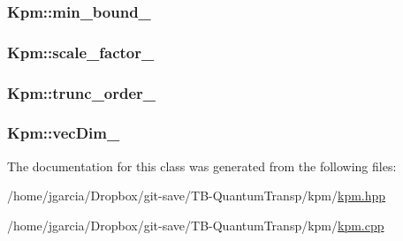 \hypertarget{classKpm_aec9beedeb9a63d641f95ac3751f6d2e4}{
\subsubsection[{min\+\_\+bound\+\_\+}]{ Kpm\+::min\+\_\+bound\+\_\+\hspace{0.3cm}{\ttfamily [private]}}}\label{classKpm_aec9beedeb9a63d641f95ac3751f6d2e4}
\hypertarget{classKpm_ab46902d3fd0d00386c373d38cf33e164}{
\subsubsection[{scale\+\_\+factor\+\_\+}]{ Kpm\+::scale\+\_\+factor\+\_\+\hspace{0.3cm}{\ttfamily [private]}}}\label{classKpm_ab46902d3fd0d00386c373d38cf33e164}
\hypertarget{classKpm_a453f8863ff6bda11edbe656e5f2aa696}{
\subsubsection[{trunc\+\_\+order\+\_\+}]{ Kpm\+::trunc\+\_\+order\+\_\+\hspace{0.3cm}{\ttfamily [private]}}}\label{classKpm_a453f8863ff6bda11edbe656e5f2aa696}
\hypertarget{classKpm_a1e10bd6603531a6a224863e2ff15dfb4}{
\subsubsection[{vec\+Dim\+\_\+}]{ Kpm\+::vec\+Dim\+\_\+\hspace{0.3cm}{\ttfamily [private]}}}\label{classKpm_a1e10bd6603531a6a224863e2ff15dfb4}


The documentation for this class was generated from the following files\+:\begin{DoxyCompactItemize}
\item 
/home/jgarcia/\+Dropbox/git-\/save/\+T\+B-\/\+Quantum\+Transp/kpm/\hyperlink{kpm_8hpp}{kpm.\+hpp}\item 
/home/jgarcia/\+Dropbox/git-\/save/\+T\+B-\/\+Quantum\+Transp/kpm/\hyperlink{kpm_8cpp}{kpm.\+cpp}\end{DoxyCompactItemize}
